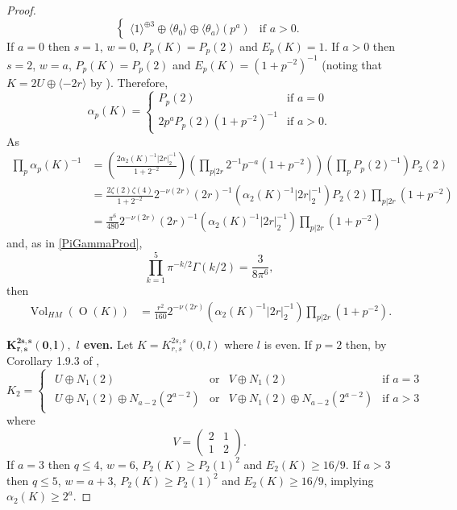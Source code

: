 \documentclass[12pt, a4paper]{article}
\newcommand{\la}{\langle}
\newcommand{\ra}{\rangle}
\newcommand{\opn}{\operatorname}
\newcommand{\op}{\oplus}
\begin{document}
\begin{proof}
\begin{equation}
\begin{cases}
      \la 1 \ra^{\op 3} \op \la \theta_0 \ra \op \la \theta_a \ra (p^a) & \text{if $a>0$}.
    \end{cases}
  \end{equation}
  If $a=0$ then $s=1$, $w=0$, $P_p(K) = P_p(2)$ and $E_p(K)=1$.
  If $a>0$ then $s=2$, $w=a$, $P_p(K) = P_p(2)$ and $E_p(K)=(1 + p^{-2})^{-1}$ (noting that $K = 2U \op \la -2r \ra$ by \cite[Corollary 1.13.4]{Nikulin}).
  Therefore,
  \[
    \alpha_p(K) =
    \begin{cases}
      P_p(2) & \text{if $a=0$} \\
      2 p^a P_p(2) (1 + p^{-2})^{-1} & \text{if $a>0$.}
    \end{cases}
  \]
  As
  \begin{align*}
    \prod_p \alpha_p(K)^{-1}
    & =  \left (\frac{ 2 \alpha_2(K)^{-1} \vert 2r \vert_2^{-1}}{1+2^{-2}} \right )
    \left (\prod_{p \vert 2r} 2^{-1} p^{-a} (1+p^{-2}) \right ) \left (\prod_p P_p(2)^{-1} \right )P_2(2) \\
    & = \frac{2 \zeta(2) \zeta(4)}{1+2^{-2}} 2^{-\nu(2r)} (2r)^{-1} (\alpha_2(K)^{-1} \vert 2r \vert_2^{-1}) P_2(2) \prod_{p \vert 2r} (1 + p^{-2}) \\
    & = \frac{\pi^6}{480} 2^{-\nu(2r)} (2r)^{-1} (\alpha_2(K)^{-1} \vert 2r \vert_2^{-1}) \prod_{p \vert 2r} (1 + p^{-2})
  \end{align*}
  and, as in \eqref{PiGammaProd}, 
  \begin{equation}\label{gamma5}
    \prod_{k=1}^5 \pi^{-k/2} \Gamma(k/2) = \frac{3}{8 \pi^{6}},
  \end{equation}
  then
  \begin{align*}
    \opn{Vol}_{HM}(\opn{O}(K))
& = \frac{r^2}{160} 2^{-\nu(2r)} (\alpha_2(K)^{-1} \vert 2r \vert_2^{-1}) \prod_{p \vert 2r} (1 + p^{-2}).
  \end{align*}
    
  \noindent $\mathbf{K^{2s,s}_{r,s}(0,l),}$  \textbf{$l$ even.}
  Let $K=K^{2s,s}_{r,s}(0,l)$ where $l$ is even.
  If $p=2$ then, by Corollary 1.9.3 of \cite{Nikulin},
  \begin{equation*}
    K_2 =
    \begin{cases}
      \begin{array}{llll}
        U \op N_1(2) & \text{or} & V \op N_1(2) & \text{if $a=3$}  \\
        U \op N_1(2) \op N_{a-2}(2^{a-2}) & \text{or} & V \op N_1(2)  \op N_{a-2}(2^{a-2}) & \text{if $a>3$}
      \end{array}
    \end{cases}
  \end{equation*}
  where
  \begin{equation*}
    V =
    \begin{pmatrix}
      2 & 1 \\
      1 & 2
    \end{pmatrix}.
  \end{equation*}
  If $a=3$ then $q \leq 4$, $w = 6$, $P_2(K) \geq P_2(1)^2$ and $E_2(K) \geq 16/9$.
  If $a>3$ then $q \leq 5$, $w=a+3$, $P_2(K) \geq P_2(1)^2$ and $E_2(K) \geq 16/9$, implying $\alpha_2(K) \geq 2^a$.


\end{proof}
\end{document}
